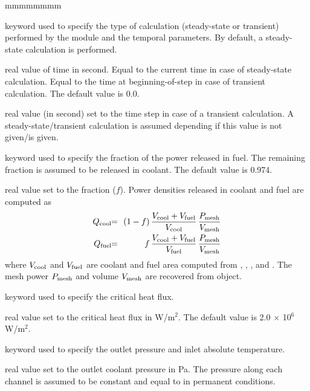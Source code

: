 \begin{ListeDeDescription}{mmmmmmmm}
\item[\moc{TIME}] keyword used to specify the type of calculation (steady-state or transient) performed by the  module and the temporal parameters. By default, a steady-state calculation is performed.
\item[\dusa{time}] real value of time in second. Equal to the current time in case of steady-state calculation. Equal to the time at beginning-of-step in
case of transient calculation. The default value is 0.0.
\item[\dusa{timestep}] real value (in second) set to the time step in case of a transient calculation. A steady-state/transient calculation is assumed
depending if this value is not given/is given. 

\item[\moc{FPUISS}] keyword used to specify the fraction of the power released in fuel. The remaining
fraction is assumed to be released in coolant. The default value is 0.974.

\item[\dusa{fract}] real value set to the fraction ($f$). Power densities released in coolant and
fuel are computed as
\begin{eqnarray*}
Q_{\rm cool} \negthinspace\negthinspace &=& \negthinspace\negthinspace (1-f)\, {V_{\rm cool}+V_{\rm fuel} \over V_{\rm cool}} \, {P_{\rm mesh} \over
V_{\rm mesh}} \\
Q_{\rm fuel} \negthinspace\negthinspace &=& \negthinspace\negthinspace f\, {V_{\rm cool}+V_{\rm fuel} \over V_{\rm fuel}} \, {P_{\rm mesh} \over
V_{\rm mesh}}
\end{eqnarray*}
\noindent where $V_{\rm cool}$ and $V_{\rm fuel}$ are coolant and fuel area computed from
, , ,  and . The mesh power $P_{\rm mesh}$ and
volume $V_{\rm mesh}$ are recovered from  object.

\item[\moc{CRITFL}] keyword used to specify the critical heat flux.

\item[\dusa{cflux}] real value set to the critical heat flux in W/m$^2$. The default value is 2.0
$\times$ 10$^6$ W/m$^2$.

\item[\moc{INLET}] keyword used to specify the outlet pressure and inlet absolute temperature.

\item[\dusa{poutlet}] real value set to the outlet coolant pressure in Pa. The pressure along each channel is assumed to be
constant and equal to  in permanent conditions.


\end{ListeDeDescription}
